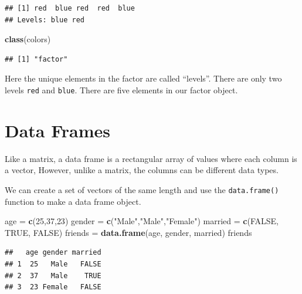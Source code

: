 \documentclass[
]{book}
\newenvironment{Shaded}{\begin{snugshade}}{\end{snugshade}}
\newcommand{\DecValTok}[1]{\textcolor[rgb]{0.00,0.00,0.81}{#1}}
\newcommand{\KeywordTok}[1]{\textcolor[rgb]{0.13,0.29,0.53}{\textbf{#1}}}
\newcommand{\NormalTok}[1]{#1}
\newcommand{\OtherTok}[1]{\textcolor[rgb]{0.56,0.35,0.01}{#1}}
\newcommand{\StringTok}[1]{\textcolor[rgb]{0.31,0.60,0.02}{#1}}
\begin{document}
\begin{verbatim}
## [1] red  blue red  red  blue
## Levels: blue red
\end{verbatim}

\begin{Shaded}
\begin{Highlighting}[]
\KeywordTok{class}\NormalTok{(colors)}
\end{Highlighting}
\end{Shaded}

\begin{verbatim}
## [1] "factor"
\end{verbatim}

Here the unique elements in the factor are called ``levels''. There are only two levels \texttt{red} and \texttt{blue}. There are five elements in our factor object.

\hypertarget{data-frames}{%
\section{Data Frames}\label{data-frames}}

Like a matrix, a data frame is a rectangular array of values where each column is a vector, However, unlike a matrix, the columns can be different data types.

We can create a set of vectors of the same length and use the \texttt{data.frame()} function to make a data frame object.

\begin{Shaded}
\begin{Highlighting}[]
\NormalTok{age =}\StringTok{ }\KeywordTok{c}\NormalTok{(}\DecValTok{25}\NormalTok{,}\DecValTok{37}\NormalTok{,}\DecValTok{23}\NormalTok{)}
\NormalTok{gender =}\StringTok{ }\KeywordTok{c}\NormalTok{(}\StringTok{"Male"}\NormalTok{,}\StringTok{"Male"}\NormalTok{,}\StringTok{"Female"}\NormalTok{)}
\NormalTok{married =}\StringTok{ }\KeywordTok{c}\NormalTok{(}\OtherTok{FALSE}\NormalTok{, }\OtherTok{TRUE}\NormalTok{, }\OtherTok{FALSE}\NormalTok{)}
\NormalTok{friends =}\StringTok{ }\KeywordTok{data.frame}\NormalTok{(age, gender, married)}
\NormalTok{friends}
\end{Highlighting}
\end{Shaded}

\begin{verbatim}
##   age gender married
## 1  25   Male   FALSE
## 2  37   Male    TRUE
## 3  23 Female   FALSE
\end{verbatim}
\end{document}
